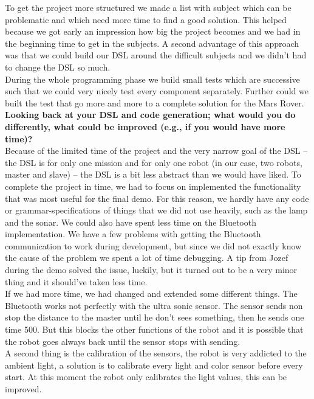 \documentclass[11pt,a4paper]{article}
\begin{document}
To get the project more structured we made a list with subject which can be problematic and which need more time to find a good solution. This helped because we got early an impression how big the project becomes and we had in the beginning time to get in the subjects. A second advantage of this approach was that we could build our DSL around the difficult subjects and we didn't had to change the DSL so much. \\
During the whole programming phase we build small tests which are successive such that we could very nicely test every component separately. Further could we built the test that go more and more to a complete solution for the Mars Rover.\\

\textbf{Looking back at your DSL and code generation; what would you do differently, what could be improved (e.g., if you would have more time)?}\\
Because of the limited time of the project and the very narrow goal of the DSL -- the DSL is for only one mission and for only one robot (in our case, two robots, master and slave) -- the DSL is a bit less abstract than we would have liked. To complete the project in time, we had to focus on implemented the functionality that was most useful for the final demo. For this reason, we hardly have any code or grammar-specifications of things that we did not use heavily, such as the lamp and the sonar. 
We could also have spent less time on the Bluetooth implementation. We have a few problems with getting the Bluetooth communication to work during development, but since we did not exactly know the cause of the problem we spent a lot of time debugging. A tip from Jozef during the demo solved the issue, luckily, but it turned out to be a very minor thing and it should've taken less time.\\
If we had more time, we had changed and extended some different things. The Bluetooth works not perfectly with the ultra sonic sensor. The sensor sends non stop the distance to the master until he don't sees something, then he sends one time 500. But this blocks the other functions of the robot and it is possible that the robot goes always back until the sensor stops with sending. \\
A second thing is the calibration of the sensors, the robot is very addicted to the ambient light, a solution is to calibrate every light and color sensor before every start. At this moment the robot only calibrates the light values, this can be improved.\\
\end{document}
